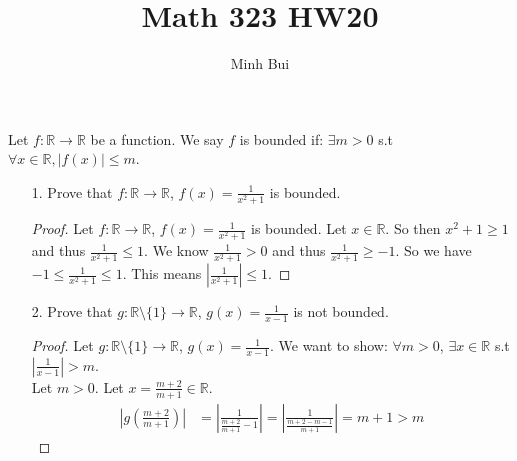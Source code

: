 \documentclass{article}
\author{Minh Bui}
\title{Math 323 HW20}
\theoremstyle{claim}
\theoremstyle{definition}
\begin{document}
\maketitle
Let $f: \mathbb{R} \rightarrow \mathbb{R}$ be a function. We say $f$ is bounded if: $\exists m > 0$ s.t $\forall x \in \mathbb{R}, |f(x)| \le m$.
\begin{enumerate}
    \item[1.] Prove that $f: \mathbb{R} \rightarrow \mathbb{R}$, $f(x) = \frac{1}{x^2 + 1}$ is bounded.
    \begin{proof}
        Let $f: \mathbb{R} \rightarrow \mathbb{R}$, $f(x) = \frac{1}{x^2+1}$ is bounded. Let $x \in \mathbb{R}$. So then $x^2 + 1 \ge 1$ and thus $\frac{1}{x^2+1} \le 1$. We know $\frac{1}{x^2+1} > 0$ and thus $\frac{1}{x^2+1} \ge -1$. So we have $-1 \le \frac{1}{x^2+1} \le 1$. This means $|\frac{1}{x^2+1}| \le 1$.
    \end{proof}
    \item[2.] Prove that $g: \mathbb{R} \setminus \{1\} \rightarrow \mathbb{R}$, $g(x) = \frac{1}{x-1}$ is not bounded.
    \begin{proof}
        Let $g: \mathbb{R} \setminus \{1\} \rightarrow \mathbb{R}$, $g(x) = \frac{1}{x-1}$. We want to show: $\forall m > 0$, $\exists x \in \mathbb{R}$ s.t $|\frac{1}{x-1}| > m$.\\
        Let $m > 0$. Let $x = \frac{m+2}{m+1} \in \mathbb{R}$.
        \begin{align*}
            |g(\frac{m+2}{m+1})| & = | \frac{1}{\frac{m+2}{m+1} - 1} | = | \frac{1}{\frac{m + 2 - m - 1}{m+1}} | = m + 1 > m
        \end{align*}
    \end{proof}
\end{enumerate}
\end{document}
